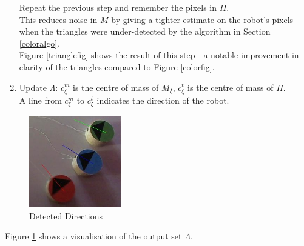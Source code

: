 \documentclass[10pt,a4paper]{article}
\begin{document}
\begin{enumerate}
    Repeat the previous step and remember the pixels in $\Pi$. \\
    This reduces noise in $M$ by giving a tighter estimate on the robot's
    pixels when the triangles were under-detected by the algorithm in 
    Section \ref{coloralgo}. \\
    Figure \ref{trianglefig} shows the result of this step - a notable
    improvement in clarity of the triangles compared to Figure \ref{colorfig}.
    \item
    Update $\Lambda$: $c^m_\xi$ is the centre of mass of $M_\xi$, $c^t_\xi$ is 
    the centre of mass of $\Pi$. \\
    A line from $c^m_\xi$ to $c^t_\xi$ indicates the direction of the robot.
\end{enumerate} 
\begin{figure}[ht]
    \centering
    \includegraphics[width=40mm]{src/d1_i5_result.jpg}
    \caption{Detected Directions}
    \label{directionfig}
\end{figure} 
Figure \ref{directionfig} shows a visualisation of the output set $\Lambda$.
\end{document}

